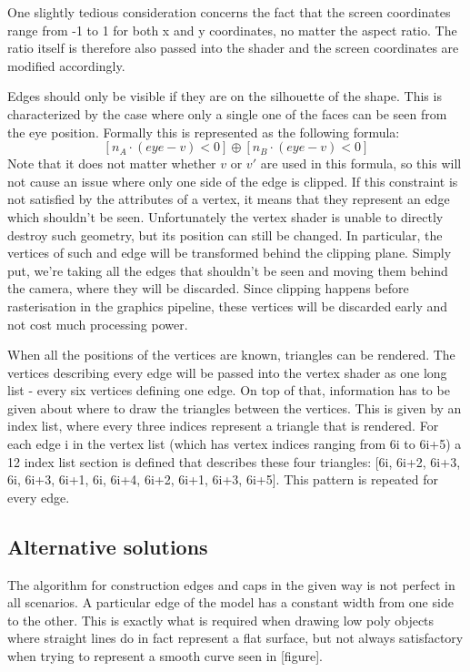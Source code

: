 \documentclass[a4paper, 12pt]{article}
\begin{document}
One slightly tedious consideration concerns the fact that the screen coordinates range from -1 to 1 for both x and y coordinates, no matter the aspect ratio. The ratio itself is therefore also passed into the shader and the screen coordinates are modified accordingly.

Edges should only be visible if they are on the silhouette of the shape. This is characterized by the case where only a single one of the faces can be seen from the eye position. Formally this is represented as the following formula:
$$[n_A \cdot (eye-v) < 0] \oplus [n_B \cdot (eye-v) < 0]$$
Note that it does not matter whether $v$ or $v'$ are used in this formula, so this will not cause an issue where only one side of the edge is clipped. If this constraint is not satisfied by the attributes of a vertex, it means that they represent an edge which shouldn't be seen. Unfortunately the vertex shader is unable to directly destroy such geometry, but its position can still be changed. In particular, the vertices of such and edge will be transformed behind the clipping plane. Simply put, we're taking all the edges that shouldn't be seen and moving them behind the camera, where they will be discarded. Since clipping happens before rasterisation in the graphics pipeline, these vertices will be discarded early and not cost much processing power.

When all the positions of the vertices are known, triangles can be rendered. The vertices describing every edge will be passed into the vertex shader as one long list - every six vertices defining one edge. On top of that, information has to be given about where to draw the triangles between the vertices. This is given by an index list, where every three indices represent a triangle that is rendered. For each edge i in the vertex list (which has vertex indices ranging from 6i to 6i+5) a 12 index list section is defined that describes these four triangles: [6i, 6i+2, 6i+3, 6i, 6i+3, 6i+1, 6i, 6i+4, 6i+2, 6i+1, 6i+3, 6i+5]. This pattern is repeated for every edge.


\subsection{Alternative solutions}

The algorithm for construction edges and caps in the given way is not perfect in all scenarios. A particular edge of the model has a constant width from one side to the other. This is exactly what is required when drawing low poly objects where straight lines do in fact represent a flat surface, but not always satisfactory when trying to represent a smooth curve seen in [figure].
\end{document}
